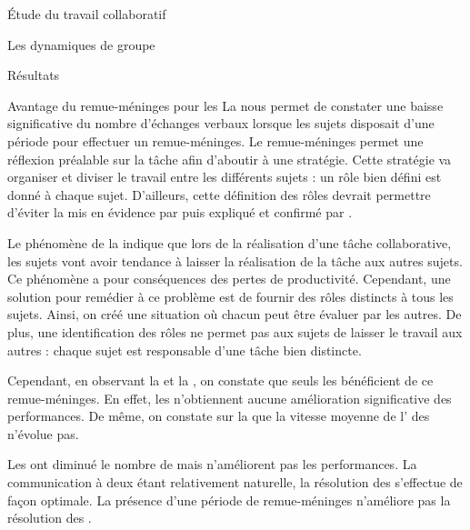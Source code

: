 \documentclass[myfrancais]{mythesis}
\begin{document}
\begin{mypart}{Étude du travail collaboratif}
\begin{mychapter}{Les dynamiques de groupe}
\begin{mysection}{Résultats}
\begin{mysubsection}{Avantage du remue-méninges pour les }
					La  nous permet de constater une baisse significative du nombre d'échanges verbaux lorsque les sujets disposait d'une période pour effectuer un remue-méninges.
					Le remue-méninges permet une réflexion préalable sur la tâche afin d'aboutir à une stratégie.
					Cette stratégie va organiser et diviser le travail entre les différents sujets : un rôle bien défini est donné à chaque sujet.
					D'ailleurs, cette définition des rôles devrait permettre d'éviter la  mis en évidence par  puis expliqué et confirmé par .

					Le phénomène de la  indique que lors de la réalisation d'une tâche collaborative, les sujets vont avoir tendance à laisser la réalisation de la tâche aux autres sujets.
					Ce phénomène a pour conséquences des pertes de productivité.
					Cependant, une solution pour remédier à ce problème est de fournir des rôles distincts à tous les sujets.
					Ainsi, on créé une situation où chacun peut être évaluer par les autres.
					De plus, une identification des rôles ne permet pas aux sujets de laisser le travail aux autres : chaque sujet est responsable d'une tâche bien distincte.

					Cependant, en observant la  et la , on constate que seuls les  bénéficient de ce remue-méninges.
					En effet, les  n'obtiennent aucune amélioration significative des performances.
					De même, on constate sur la  que la vitesse moyenne de l' des  n'évolue pas.

					Les  ont diminué le nombre de  mais n'améliorent pas les performances.
					La communication à deux étant relativement naturelle, la résolution des  s'effectue de façon optimale.
					La présence d'une période de remue-méninges n'améliore pas la résolution des .


\end{mysubsection}
\end{mysection}
\end{mychapter}
\end{mypart}
\end{document}
